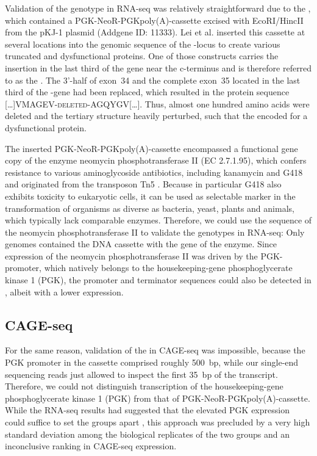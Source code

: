 Validation of the \dnmtchip genotype in RNA-seq was relatively straightforward due to the \dnmtnegallele, which contained a PGK-NeoR-PGKpoly(A)-cassette\cite{Adra1987,Tybulewicz1991} excised with EcoRI/HincII from the pKJ-1 plasmid (Addgene ID: 11333). 
Lei et al.\cite{Lei1996} inserted this cassette at several locations into the genomic sequence of the -locus to create various truncated and dysfunctional proteins. One of those constructs carries the insertion in the last third of the gene near the c-terminus and is therefore referred to as the \dnmtcallele. The 3’-half of exon~34 and the complete exon~35 located in the last third of the -gene had been replaced, which resulted in the protein sequence \textsc{[…]VMAGEV-deleted-AGQYGV[…]}. Thus, almost one hundred amino acids were deleted and the tertiary structure heavily perturbed, such that the \dnmtcallele encoded for a dysfunctional protein. 

The inserted PGK-NeoR-PGKpoly(A)-cassette encompassed a functional gene copy of the enzyme neomycin phosphotransferase II (EC 2.7.1.95), which confers resistance to various aminoglycoside antibiotics, including kanamycin and G418 and originated from the transposon Tn5 \cite{Yenofsky1990}. Because in particular G418 also exhibits toxicity to eukaryotic cells, it can be used as selectable marker in the transformation of organisms as diverse as bacteria, yeast, plants and animals, which typically lack comparable enzymes.
Therefore, we could use the sequence of the neomycin phosphotransferase II to validate the genotypes in RNA-seq: Only \dnmtchip genomes contained the DNA cassette with the gene of the enzyme. Since expression of the neomycin phosphotransferase II was driven by the PGK-promoter, which natively belongs to the housekeeping-gene phosphoglycerate kinase 1 (PGK), the promoter and terminator sequences could also be detected in \dnmtwt, albeit with a lower expression. 

\subsection{CAGE-seq}
\label{chap:r:transcription:genotypeval:cage}

For the same reason, validation of the \dnmtcallele in CAGE-seq was impossible, because the PGK promoter in the cassette comprised roughly \SI{500}{bp}, while our single-end sequencing reads just allowed to inspect the first \SI{35}{bp} of the transcript. Therefore, we could not distinguish transcription of the housekeeping-gene phosphoglycerate kinase 1 (PGK) from that of PGK-NeoR-PGKpoly(A)-cassette.
While the RNA-seq results had suggested that the elevated PGK expression could suffice to set the groups apart , this approach was precluded by a very high standard deviation among the biological replicates of the two groups and an inconclusive ranking in CAGE-seq expression. 

